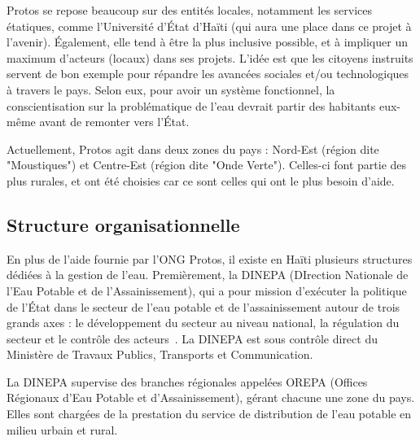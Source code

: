 \documentclass{EPL-master-thesis-covers-FR}
\begin{document}
				Protos se repose beaucoup sur des entités locales, notamment les services étatiques, comme l'Université d'\'Etat d'Haïti (qui aura une place dans ce projet à l'avenir). \'Egalement, elle tend à être la plus inclusive possible, et à impliquer un maximum d'acteurs (locaux) dans ses projets. L'idée est que les citoyens instruits servent de bon exemple pour répandre les avancées sociales et/ou technologiques à travers le pays. Selon eux, pour avoir un système fonctionnel, la conscientisation sur la problématique de l'eau devrait partir des habitants eux-même avant de remonter vers l'\'Etat.


				Actuellement, Protos agit dans deux zones du pays : Nord-Est (région dite "Moustiques") et Centre-Est (région dite "Onde Verte"). Celles-ci font partie des plus rurales, et ont été choisies car ce sont celles qui ont le plus besoin d'aide.

			\subsection*{Structure organisationnelle}
				\label{sec:structure_haiti}


				En plus de l'aide fournie par l'ONG Protos, il existe en Haïti plusieurs structures dédiées à la gestion de l'eau. Premièrement, la DINEPA (DIrection Nationale de l'Eau Potable et de l'Assainissement), qui a pour mission d’exécuter la politique de l’\'Etat dans le secteur de l’eau potable et de l’assainissement autour de trois grands axes : le développement du secteur au niveau national, la régulation du secteur et le contrôle des acteurs~\cite{ref:dinepa}. La DINEPA est sous contrôle direct du Ministère de Travaux Publics, Transports et Communication.

				La DINEPA supervise des branches régionales appelées OREPA (Offices Régionaux d'Eau Potable et d'Assainissement), gérant chacune une zone du pays. Elles sont chargées de la prestation du service de distribution de l'eau potable en milieu urbain et rural.
\end{document}
